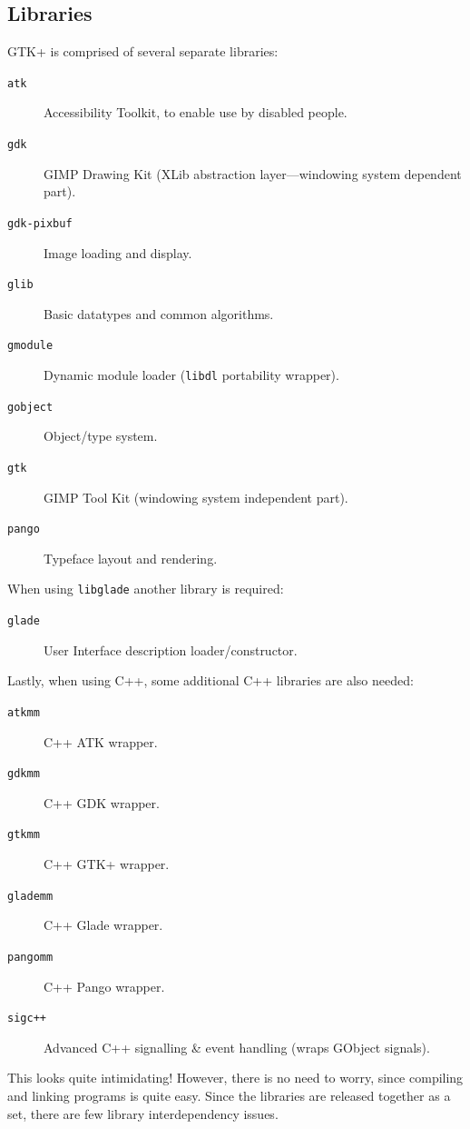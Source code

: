 \documentclass[a4paper,oneside]{article}
\newcommand{\filename}[1]{\texttt{#1}}
\begin{document}
\subsection{Libraries}

GTK+ is comprised of several separate libraries:

\begin{description}
\item[\filename{atk}] Accessibility Toolkit, to enable use by disabled
  people.
\item[\filename{gdk}] GIMP Drawing Kit (XLib abstraction
  layer---windowing system dependent part).
\item[\filename{gdk-pixbuf}] Image loading and display.
\item[\filename{glib}] Basic datatypes and common algorithms.
\item[\filename{gmodule}] Dynamic module loader (\filename{libdl}
  portability wrapper).
\item[\filename{gobject}] Object/type system.
\item[\filename{gtk}] GIMP Tool Kit (windowing system independent part).
\item[\filename{pango}] Typeface layout and rendering.
\end{description}

When using \filename{libglade} another library is required:

\begin{description}
\item[\filename{glade}] User Interface description loader/constructor.
\end{description}

Lastly, when using C++, some additional C++ libraries are also needed:

\begin{description}
\item[\filename{atkmm}] C++ ATK wrapper.
\item[\filename{gdkmm}] C++ GDK wrapper.
\item[\filename{gtkmm}] C++ GTK+ wrapper.
\item[\filename{glademm}] C++ Glade wrapper.
\item[\filename{pangomm}] C++ Pango wrapper.
\item[\filename{sigc++}] Advanced C++ signalling \& event handling
  (wraps GObject signals).
\end{description}

This looks quite intimidating!  However, there is no need to worry,
since compiling and linking programs is quite easy.  Since the
libraries are released together as a set, there are few library
interdependency issues.
\end{document}
